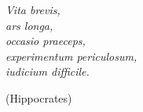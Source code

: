 \begin{epigrafe}{
    \it
    Vita brevis,\\
    ars longa,\\
    occasio praeceps,\\
    experimentum periculosum,\\
    iudicium difficile.\\
}

\hfill (Hippocrates)
\end{epigrafe}